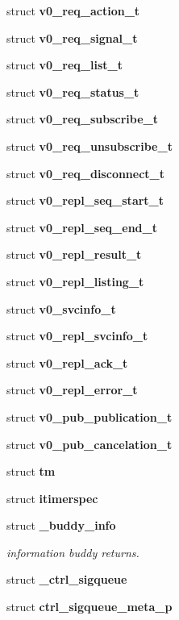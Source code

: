 \begin{DoxyCompactItemize}
\item 
struct {\bf v0\_\-req\_\-action\_\-t}
\item 
struct {\bf v0\_\-req\_\-signal\_\-t}
\item 
struct {\bf v0\_\-req\_\-list\_\-t}
\item 
struct {\bf v0\_\-req\_\-status\_\-t}
\item 
struct {\bf v0\_\-req\_\-subscribe\_\-t}
\item 
struct {\bf v0\_\-req\_\-unsubscribe\_\-t}
\item 
struct {\bf v0\_\-req\_\-disconnect\_\-t}
\item 
struct {\bf v0\_\-repl\_\-seq\_\-start\_\-t}
\item 
struct {\bf v0\_\-repl\_\-seq\_\-end\_\-t}
\item 
struct {\bf v0\_\-repl\_\-result\_\-t}
\item 
struct {\bf v0\_\-repl\_\-listing\_\-t}
\item 
struct {\bf v0\_\-svcinfo\_\-t}
\item 
struct {\bf v0\_\-repl\_\-svcinfo\_\-t}
\item 
struct {\bf v0\_\-repl\_\-ack\_\-t}
\item 
struct {\bf v0\_\-repl\_\-error\_\-t}
\item 
struct {\bf v0\_\-pub\_\-publication\_\-t}
\item 
struct {\bf v0\_\-pub\_\-cancelation\_\-t}
\item 
struct {\bf tm}
\item 
struct {\bf itimerspec}
\item 
struct {\bf \_\-buddy\_\-info}
\begin{DoxyCompactList}\small\item\em information buddy returns. \end{DoxyCompactList}\item 
struct {\bf \_\-ctrl\_\-sigqueue}
\item 
struct {\bf ctrl\_\-sigqueue\_\-meta\_\-p}
\end{DoxyCompactItemize}
